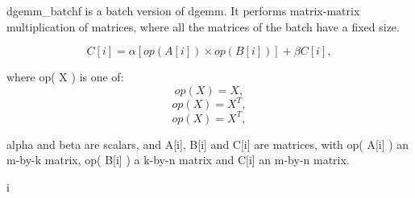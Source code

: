 dgemm\+\_\+batchf is a batch version of dgemm. It performs matrix-\/matrix multiplication of matrices, where all the matrices of the batch have a fixed size.

\[ C[i] = \alpha [op( A[i] )\times op( B[i] )] + \beta C[i], \]

where op( X ) is one of\+: \[ op( X ) = X, \] \[ op( X ) = X^T, \] \[ op( X ) = X^T, \]

alpha and beta are scalars, and A\mbox{[}i\mbox{]}, B\mbox{[}i\mbox{]} and C\mbox{[}i\mbox{]} are matrices, with op( A\mbox{[}i\mbox{]} ) an m-\/by-\/k matrix, op( B\mbox{[}i\mbox{]} ) a k-\/by-\/n matrix and C\mbox{[}i\mbox{]} an m-\/by-\/n matrix. \begin{DoxyVerb}                                                                        i
\end{DoxyVerb}
 
